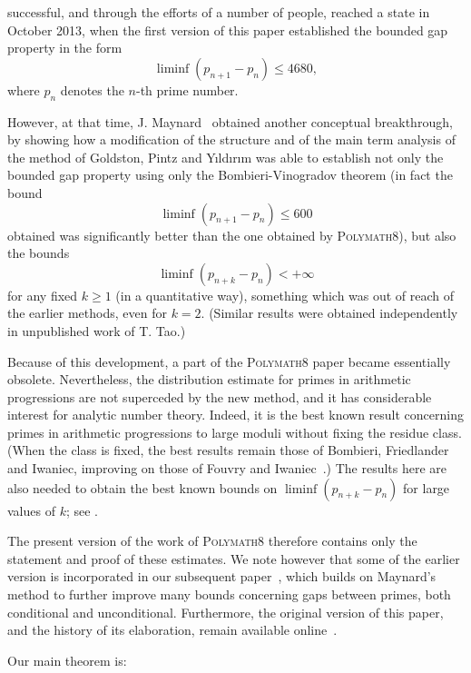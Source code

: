 \documentclass[12pt,a4paper,reqno]{amsart}
\numberwithin{equation}{section}
\theoremstyle{plain}
\theoremstyle{definition}
\begin{document}
successful, and through the efforts of a number of people, reached a
state in October 2013, when the first version of this paper \cite{poly8-original}
established the bounded gap property in the form
$$
\liminf (p_{n+1}-p_n)\leq 4680,
$$
where $p_n$ denotes the $n$-th prime number.
\par
However, at that time, J. Maynard~\cite{maynard-new} obtained another
conceptual breakthrough, by showing how a modification of the
structure and of the main term analysis of the method of Goldston,
Pintz and Y\i ld\i r\i m was able to establish not only the bounded
gap property using only the Bombieri-Vinogradov theorem (in fact the
bound
$$
\liminf (p_{n+1}-p_n)\leq 600
$$
obtained was significantly better than the one obtained by \textsc{Polymath8}), but
also the bounds
$$
\liminf (p_{n+k}-p_n)<+\infty
$$
for any fixed $k\geq 1$ (in a quantitative way), something which was
out of reach of the earlier methods, even for $k=2$. (Similar results
were obtained independently in unpublished work of T. Tao.)
\par
Because of this development, a part of the \textsc{Polymath8} paper
became essentially obsolete.  Nevertheless, the distribution estimate
for primes in arithmetic progressions are not superceded by the new
method, and it has considerable interest for analytic number
theory. Indeed, it is the best known result concerning primes in
arithmetic progressions to large moduli without fixing the residue
class. (When the class is fixed, the best results remain those of
Bombieri, Friedlander and Iwaniec, improving on those of Fouvry and
Iwaniec~\cite{fi-2,bfi}.)  The results here are also needed to obtain the best known bounds on $\liminf (p_{n+k}-p_n)$ for large values of $k$; see \cite{poly8b}.
\par
The present version of the work of \textsc{Polymath8} therefore
contains only the statement and proof of these estimates.  We note
however that some of the earlier version is incorporated in our subsequent
paper~\cite{poly8b}, which builds on Maynard's method to further
improve many bounds concerning gaps between primes, both conditional
and unconditional.  Furthermore, the original version of this paper, and the history
of its elaboration, remain available online~\cite{poly8-original}.
\par
\medskip
\par
Our main theorem is:
\end{document}
